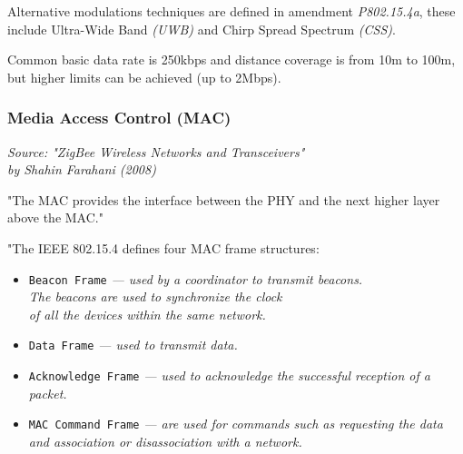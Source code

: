  Alternative modulations techniques are defined in amendment
 \emph{P802.15.4a}, these include Ultra-Wide Band \emph{(UWB)}
 and Chirp Spread Spectrum \emph{(CSS)}.

 Common basic data rate is 250kbps and distance coverage is from 10m
 to 100m, but higher limits can be achieved (up to 2Mbps).

\subsubsection{Media Access Control (MAC)}

\begin{flushright} \small{
\emph{Source: "ZigBee Wireless Networks and Transceivers" \\
	by Shahin Farahani (2008) \cite{b:zigbee}}}
	\end{flushright}

  "The MAC provides the interface between the PHY
 and the next higher layer above the MAC."


 "The IEEE 802.15.4 defines four MAC frame structures:
\begin{itemize}
       \item \texttt{Beacon Frame}
	\small{\emph{ --- used by a coordinator to transmit beacons.\\
       			The beacons are used to synchronize the clock\\
			of all the devices within the same network.}}
       \item \texttt{Data Frame}
	\small{\emph{ --- used to transmit data.}}

       \item \texttt{Acknowledge Frame}
	\small{\emph{ --- used to acknowledge the successful reception of a packet.}}
       \item \texttt{MAC Command Frame}
	\small{\emph{ --- are used for commands such as requesting the data\\
			  and association or disassociation with a network.}}

\end{itemize}

